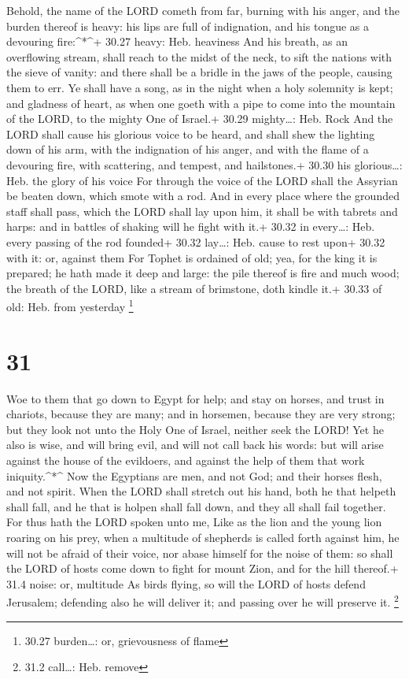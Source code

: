  Behold, the name of the LORD cometh from far, burning with
his anger, and the burden thereof is heavy: his lips are full of
indignation, and his tongue as a devouring fire:\^{}*\^{}+ 30.27 heavy:
Heb. heaviness  And his breath, as an overflowing stream,
shall reach to the midst of the neck, to sift the nations with the sieve
of vanity: and there shall be a bridle in the jaws of the people,
causing them to err.  Ye shall have a song, as in the night
when a holy solemnity is kept; and gladness of heart, as when one goeth
with a pipe to come into the mountain of the LORD, to the mighty One of
Israel.+ 30.29 mighty\ldots: Heb. Rock  And the LORD shall
cause his glorious voice to be heard, and shall shew the lighting down
of his arm, with the indignation of his anger, and with the flame of a
devouring fire, with scattering, and tempest, and hailstones.+ 30.30 his
glorious\ldots: Heb. the glory of his voice  For through
the voice of the LORD shall the Assyrian be beaten down, which smote
with a rod.  And in every place where the grounded staff
shall pass, which the LORD shall lay upon him, it shall be with tabrets
and harps: and in battles of shaking will he fight with it.+ 30.32 in
every\ldots: Heb. every passing of the rod founded+ 30.32 lay\ldots:
Heb. cause to rest upon+ 30.32 with it: or, against them 
For Tophet is ordained of old; yea, for the king it is prepared; he hath
made it deep and large: the pile thereof is fire and much wood; the
breath of the LORD, like a stream of brimstone, doth kindle it.+ 30.33
of old: Heb. from yesterday \footnote{30.27 burden\ldots: or,
  grievousness of flame}

\hypertarget{section-30}{%
\section{31}\label{section-30}}

 Woe to them that go down to Egypt for help; and stay on
horses, and trust in chariots, because they are many; and in horsemen,
because they are very strong; but they look not unto the Holy One of
Israel, neither seek the LORD!  Yet he also is wise, and
will bring evil, and will not call back his words: but will arise
against the house of the evildoers, and against the help of them that
work iniquity.\^{}*\^{}  Now the Egyptians are men, and not
God; and their horses flesh, and not spirit. When the LORD shall stretch
out his hand, both he that helpeth shall fall, and he that is holpen
shall fall down, and they all shall fail together.  For thus
hath the LORD spoken unto me, Like as the lion and the young lion
roaring on his prey, when a multitude of shepherds is called forth
against him, he will not be afraid of their voice, nor abase himself for
the noise of them: so shall the LORD of hosts come down to fight for
mount Zion, and for the hill thereof.+ 31.4 noise: or, multitude
 As birds flying, so will the LORD of hosts defend
Jerusalem; defending also he will deliver it; and passing over he will
preserve it. \footnote{31.2 call\ldots: Heb. remove}


